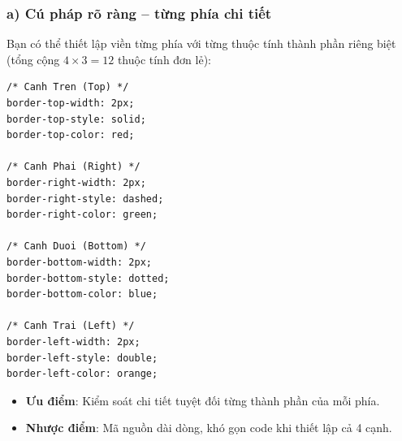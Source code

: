 \documentclass[11pt,oneside]{book}
\newcommand{\thd}[1]{\textcolor{white}{\textbf{\strut #1}}}
\newcommand{\codeinline}[1]{\textcolor{accentOrange}{\texttt{#1}}}
\begin{document}
\begin{prettyTableBox}
\end{prettyTableBox}

\subsubsection{a) Cú pháp rõ ràng -- từng phía chi tiết}

Bạn có thể thiết lập viền từng phía với từng thuộc tính thành phần riêng biệt (tổng cộng $4 \times 3 = 12$ thuộc tính đơn lẻ):

\begin{codeWindow}
\begin{lstlisting}[language=CSS3]
/* Canh Tren (Top) */
border-top-width: 2px;
border-top-style: solid;
border-top-color: red;

/* Canh Phai (Right) */
border-right-width: 2px;
border-right-style: dashed;
border-right-color: green;

/* Canh Duoi (Bottom) */
border-bottom-width: 2px;
border-bottom-style: dotted;
border-bottom-color: blue;

/* Canh Trai (Left) */
border-left-width: 2px;
border-left-style: double;
border-left-color: orange;
\end{lstlisting}
\end{codeWindow}

\begin{itemize}[leftmargin=1.5em, itemsep=2.5pt, parsep=0pt]
    \item \textbf{Ưu điểm}: Kiểm soát chi tiết tuyệt đối từng thành phần của mỗi phía.
    \item \textbf{Nhược điểm}: Mã nguồn dài dòng, khó gọn code khi thiết lập cả 4 cạnh.
\end{itemize}
\end{document}
